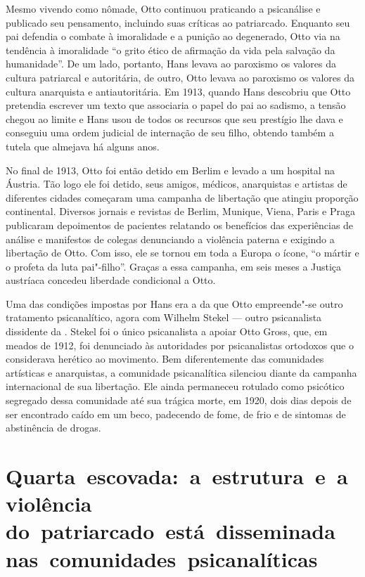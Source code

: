Mesmo vivendo como nômade, Otto continuou praticando a psicanálise e
publicado seu pensamento, incluindo suas críticas ao patriarcado.
Enquanto seu pai defendia o combate à imoralidade e a punição ao
degenerado, Otto via na tendência à imoralidade ``o grito ético de
afirmação da vida pela salvação da humanidade''. De um lado, portanto,
Hans levava ao paroxismo os valores da cultura patriarcal e autoritária,
de outro, Otto levava ao paroxismo os valores da cultura anarquista e
antiautoritária. Em 1913, quando Hans descobriu que Otto pretendia
escrever um texto que associaria o papel do pai ao sadismo, a tensão
chegou ao limite e Hans usou de todos os recursos que seu prestígio lhe
dava e conseguiu uma ordem judicial de internação de seu filho, obtendo
também a tutela que almejava há alguns anos.

No final de 1913, Otto foi então detido em Berlim e levado a um hospital
na Áustria. Tão logo ele foi detido, seus amigos, médicos, anarquistas e
artistas de diferentes cidades começaram uma campanha de libertação que
atingiu proporção continental. Diversos jornais e revistas de Berlim,
Munique, Viena, Paris e Praga publicaram depoimentos de pacientes
relatando os benefícios das experiências de análise e manifestos de
colegas denunciando a violência paterna e exigindo a libertação de Otto.
Com isso, ele se tornou em toda a Europa o ícone, ``o mártir e o profeta
da luta pai"-filho''. Graças a essa campanha, em seis meses a Justiça
austríaca concedeu liberdade condicional a Otto.

Uma das condições impostas por Hans era a da que Otto empreende"-se outro
tratamento psicanalítico, agora com Wilhelm Stekel --- outro psicanalista
dissidente da . Stekel foi o único psicanalista a apoiar Otto Gross, que, em meados de 1912, foi denunciado às autoridades por psicanalistas ortodoxos que o considerava herético ao
movimento. Bem diferentemente das comunidades artísticas e anarquistas, a
comunidade psicanalítica silenciou diante da campanha
internacional de sua libertação. Ele ainda permaneceu rotulado como psicótico segregado dessa
comunidade até sua trágica morte, em 1920, dois dias depois de ser
encontrado caído em um beco, padecendo de fome, de frio e de sintomas de
abstinência de drogas.

\section{Quarta~escovada:~a~estrutura~e~a~violência do~patriarcado~está~disseminada nas~comunidades~psicanalíticas}

